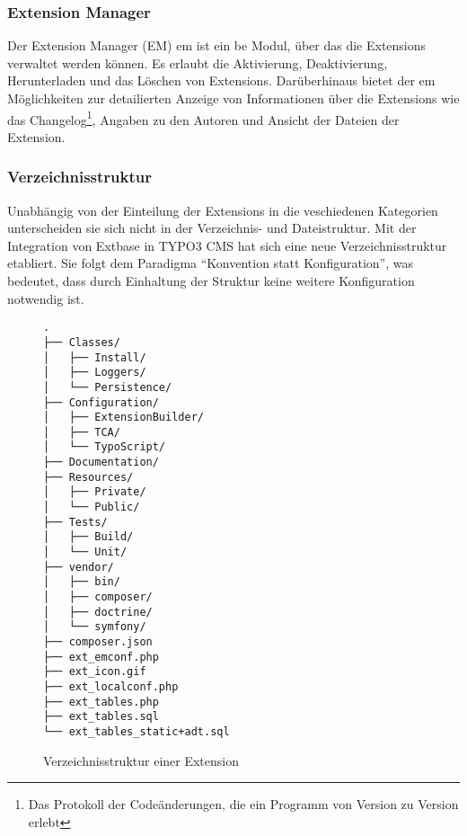 \subsubsection{Extension Manager}
Der Extension Manager (EM) \gls{em} ist ein \gls{be} Modul, über das die Extensions verwaltet werden können. Es erlaubt die Aktivierung, Deaktivierung, Herunterladen und das Löschen von Extensions. Darüberhinaus bietet der \gls{em} Möglichkeiten zur detailierten Anzeige von Informationen über die Extensions wie das Changelog\footnote{Das Protokoll der Codeänderungen, die ein Programm von Version zu Version erlebt}, Angaben zu den Autoren und Ansicht der Dateien der Extension.

\subsubsection{Verzeichnisstruktur}
Unabhängig von der Einteilung der Extensions in die veschiedenen Kategorien unterscheiden sie sich nicht in der Verzeichnis- und Dateistruktur. Mit der Integration von Extbase in TYPO3 CMS hat sich eine neue Verzeichnisstruktur etabliert. Sie folgt dem Paradigma ``Konvention statt Konfiguration'', was bedeutet, dass durch Einhaltung der Struktur keine weitere Konfiguration notwendig ist.
\begin{figure}[t]
\begin{Verbatim}[samepage=true]
.
├── Classes/
│   ├── Install/
│   ├── Loggers/
│   └── Persistence/
├── Configuration/
│   ├── ExtensionBuilder/
│   ├── TCA/
│   └── TypoScript/
├── Documentation/
├── Resources/
│   ├── Private/
│   └── Public/
├── Tests/
│   ├── Build/
│   └── Unit/
├── vendor/
│   ├── bin/
│   ├── composer/
│   ├── doctrine/
│   └── symfony/
├── composer.json
├── ext_emconf.php
├── ext_icon.gif
├── ext_localconf.php
├── ext_tables.php
├── ext_tables.sql
└── ext_tables_static+adt.sql
\end{Verbatim}
\caption{Verzeichnisstruktur einer Extension}
\label{pic:extensionFolderStructure}
\end{figure}
\pagebreak
